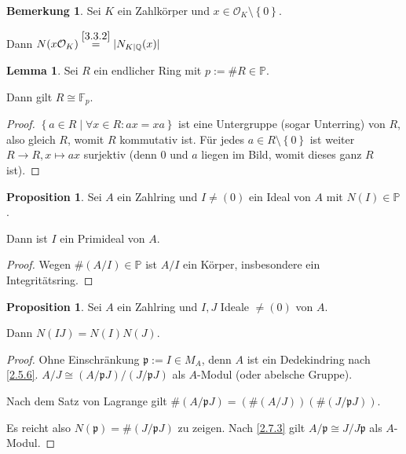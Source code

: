 \documentclass[
twoside=semi,
fontsize=12,
DIV=12, 
cleardoublepage=current,
leqno,
headings=optiontoheadandtoc, 
toc=idx
]{scrbook}
\newcommand{\Q}{\mathbb{Q}}
\newcommand{\F}{\mathbb{F}}
\renewcommand{\P}{\mathbb{P}}
\newcommand{\set}[1]{\left\{ #1 \right\}}
\theoremstyle{definition}
\newtheorem{bemerkung}[definition]{Bemerkung}
\newtheorem{lemma}[definition]{Lemma}
\newtheorem{proposition}[definition]{Proposition}
\begin{document}
 	\begin{bemerkung}\label{3.3.4}\hfill\newline
 		Sei $K$ ein Zahlk\"orper und $x \in \mathcal{O}_K \setminus \set{0}$.
 		
 		\medskip\noindent
 		Dann $N(x\mathcal{O}_K) \overset{\ref{3.3.2}}{=} |N_{K|\Q}(x)|$
 	\end{bemerkung}
 
 	\begin{lemma}\label{3.3.5}\hfill\newline
 		Sei $R$ ein endlicher Ring mit $p:= \#R \in \P$.
 		
 		\medskip\noindent
 		Dann gilt $R \cong \F_p$.
 		
 		\begin{proof}
 			$\set{a \in R\mid \forall x \in R: ax = xa}$ ist eine Untergruppe (sogar Unterring) von $R$, also
 			gleich $R$, womit $R$ kommutativ ist. F\"ur jedes $a \in R \setminus \set{0}$ ist weiter
 			$R \to R, x \mapsto ax$ surjektiv (denn $0$ und $a$ liegen im Bild, womit dieses ganz $R$ ist).
 		\end{proof}
 	\end{lemma}
 	
 	\begin{proposition}\label{3.3.6}\hfill\newline
 		Sei $A$ ein Zahlring und $I \neq (0)$ ein Ideal von $A$ mit $N(I) \in \P$. 
 		
 		\medskip\noindent 
 		Dann ist $I$ ein Primideal von $A$.
 		
 		\begin{proof}
 			Wegen $\#(A/I) \in \P$ ist $A/I$ ein K\"orper, insbesondere ein Integrit\"atsring.
 		\end{proof}
 	\end{proposition}
 	
 	\begin{proposition}\label{3.3.7}\hfill\newline
 		Sei $A$ ein Zahlring und $I, J $ Ideale $\neq (0)$ von $A$.
 		
 		\medskip\noindent
 		Dann $N(IJ) = N(I)N(J)$.
 		
 		\begin{proof}
 			Ohne Einschr\"ankung $\mathfrak{p} := I \in M_A$, denn $A$ ist ein Dedekindring nach \ref{2.5.6}.
 			$A/J \cong (A/\mathfrak{p}J)/(J/\mathfrak{p}J)$ als $A$-Modul (oder abelsche Gruppe).
 			
 			\noindent Nach dem Satz von Lagrange gilt $\#(A/\mathfrak{p}J) = (\#(A/J))(\#(J/\mathfrak{p}J))$.
 			
 			\noindent Es reicht also $N(\mathfrak{p}) = \#(J/\mathfrak{p}J)$ zu zeigen. Nach \ref{2.7.3} gilt $A/\mathfrak{p} \cong J/J\mathfrak{p}$ als $A$-Modul.  
 		\end{proof}
 	\end{proposition}
 	
\end{document}
